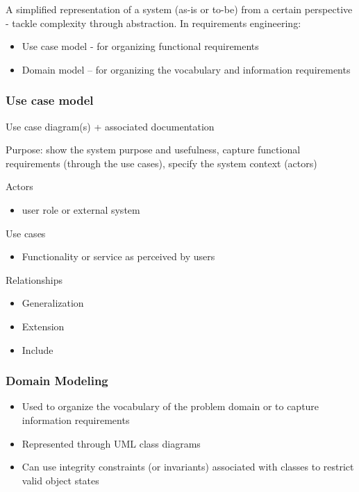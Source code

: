 \documentclass[../ESOF_notes.tex]{subfiles}
\begin{document}
A simplified representation of a system (as-is or to-be) from a certain perspective - tackle complexity through abstraction. In requirements engineering:
\begin{itemize}
    \item Use case model - for organizing functional requirements
    \item Domain model – for organizing the vocabulary and information requirements
\end{itemize}


\subsubsection{Use case model}
Use case diagram(s) + associated documentation

Purpose: show the system purpose and usefulness, capture functional requirements (through the use cases), specify the system context (actors)

Actors
\begin{itemize}
    \item user role or external system
\end{itemize}

Use cases
\begin{itemize}
    \item Functionality or service as perceived by users
\end{itemize}

Relationships

\begin{itemize}
    \item Generalization
    \item Extension
    \item Include
\end{itemize}

\subsubsection{Domain Modeling}
\begin{itemize}
    \item Used to organize the vocabulary of the problem domain or to capture information requirements
    \item Represented through UML class diagrams
    \item Can use integrity constraints (or invariants) associated with classes to restrict valid object states
\end{itemize}
\end{document}
